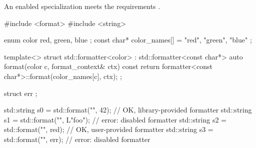 \documentclass{wg21}
\begin{document}
\pnum
An enabled specialization  meets the
 requirements .
\begin{example}
    \begin{codeblock}
        #include <format>
        #include <string>

        enum color { red, green, blue };
        const char* color_names[] = { "red", "green", "blue" };

        template<> struct std::formatter<color> : std::formatter<const char*> {
            auto format(color c, format_context& ctx) const {
                return formatter<const char*>::format(color_names[c], ctx);
            }
        };

        struct err {};

        std::string s0 = std::format("{}", 42);         // OK, library-provided formatter
        std::string s1 = std::format("{}", L"foo");     // error: disabled formatter
        std::string s2 = std::format("{}", red);        // OK, user-provided formatter
        std::string s3 = std::format("{}", err{});      // error: disabled formatter
    \end{codeblock}
\end{example}
\end{document}
